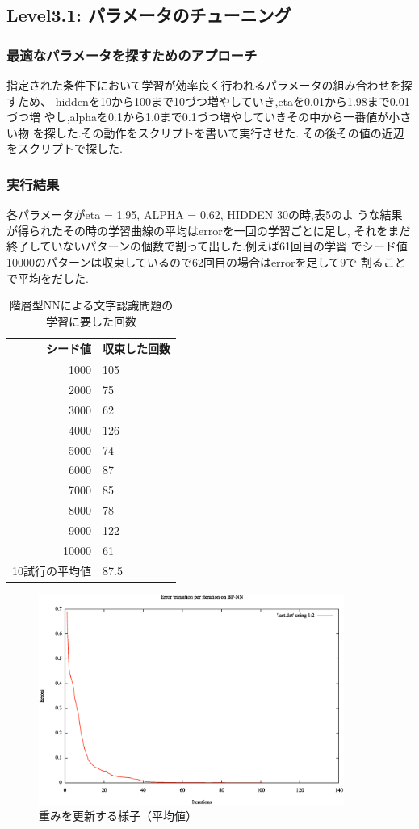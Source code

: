 \subsection{Level3.1: パラメータのチューニング}%
\subsubsection{最適なパラメータを探すためのアプローチ}
指定された条件下において学習が効率良く行われるパラメータの組み合わせを探
すため、
hiddenを10から100まで10づつ増やしていき,etaを0.01から1.98まで0.01づつ増
やし,alphaを0.1から1.0まで0.1づつ増やしていきその中から一番値が小さい物
を探した.その動作をスクリプトを書いて実行させた.
その後その値の近辺をスクリプトで探した.
\subsubsection{実行結果}
各パラメータがeta = 1.95, ALPHA = 0.62, HIDDEN 30の時,表5のよ
うな結果が得られたその時の学習曲線の平均はerrorを一回の学習ごとに足し,
それをまだ終了していないパターンの個数で割って出した.例えば61回目の学習
でシード値10000のパターンは収束しているので62回目の場合はerrorを足して9で
割ることで平均をだした.
\begin{table}[htb]
 \begin{center}
  \caption{階層型NNによる文字認識問題の学習に要した回数}
  \label{table:level3}
  \begin{tabular}[htb]{r|l} \hline
   シード値 & 収束した回数 \\ \hline \hline
   1000 & 105 \\ \hline
   2000 & 75 \\ \hline
   3000 & 62 \\ \hline
   4000 & 126 \\ \hline
   5000 & 74 \\ \hline
   6000 & 87 \\ \hline
   7000 & 85 \\ \hline
   8000 & 78 \\ \hline
   9000 & 122 \\ \hline
   10000 & 61 \\ \hline \hline
   10試行の平均値 & 87.5 \\ \hline
  \end{tabular}
 \end{center}
\end{table}

\begin{figure}[h]
 \begin{center}
  \includegraphics[width=10.0cm]{./figs/average.eps}
  \caption{重みを更新する様子（平均値）}
  \label{fig:level2}
 \end{center}
\end{figure}
\newpage


